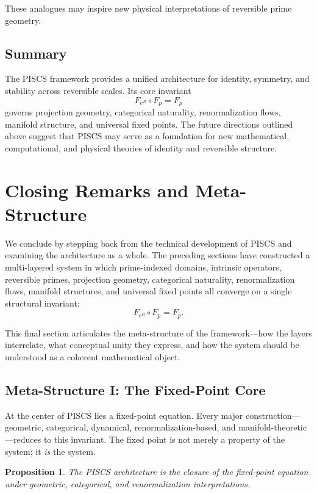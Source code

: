 \documentclass[11pt]{article}
\theoremstyle{definition}
\theoremstyle{plain}
\newtheorem{proposition}[definition]{Proposition}
\theoremstyle{remark}
\begin{document}
These analogues may inspire new physical interpretations of reversible
prime geometry.

\subsection{Summary}

The PISCS framework provides a unified architecture for identity,
symmetry, and stability across reversible scales. Its core invariant
\[
F_{e^R} \circ F_p = F_p
\]
governs projection geometry, categorical naturality, renormalization
flows, manifold structure, and universal fixed points. The future
directions outlined above suggest that PISCS may serve as a foundation
for new mathematical, computational, and physical theories of identity
and reversible structure.

\section{Closing Remarks and Meta-Structure}

We conclude by stepping back from the technical development of PISCS and
examining the architecture as a whole. The preceding sections have
constructed a multi-layered system in which prime-indexed domains,
intrinsic operators, reversible primes, projection geometry,
categorical naturality, renormalization flows, manifold structures, and
universal fixed points all converge on a single structural invariant:
\[
F_{e^R} \circ F_p = F_p.
\]

This final section articulates the meta-structure of the framework—how
the layers interrelate, what conceptual unity they express, and how the
system should be understood as a coherent mathematical object.

\subsection{Meta-Structure I: The Fixed-Point Core}

At the center of PISCS lies a fixed-point equation. Every major
construction—geometric, categorical, dynamical, renormalization-based,
and manifold-theoretic—reduces to this invariant. The fixed point is not
merely a property of the system; it \emph{is} the system.

\begin{proposition}
The PISCS architecture is the closure of the fixed-point equation under
geometric, categorical, and renormalization interpretations.
\end{proposition}
\end{document}
